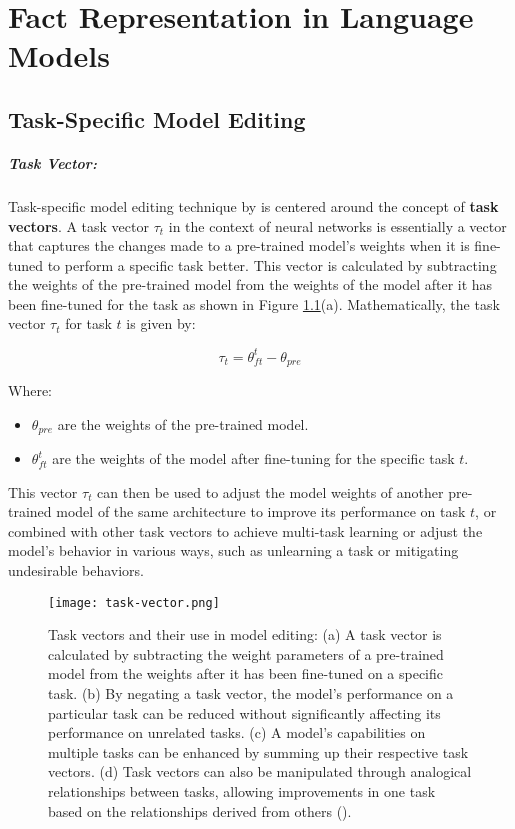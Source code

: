 \chapter{Fact Representation in Language Models}\label{chp: Fact}
\section{Task-Specific Model Editing}
\paragraph{Task Vector:} Task-specific model editing technique by \citet{ilharco2023editing} is centered around the concept of \textbf{task vectors}. A task vector \( \tau_t \) in the context of neural networks is essentially a vector that captures the changes made to a pre-trained model's weights when it is fine-tuned to perform a specific task better. This vector is calculated by subtracting the weights of the pre-trained model from the weights of the model after it has been fine-tuned for the task as shown in Figure \ref{fig:task-vector}(a). Mathematically, the task vector \( \tau_t \) for task \( t \) is given by:

\begin{equation}
\tau_t = \theta^t_{ft} - \theta_{pre}
\end{equation}

Where:
\begin{itemize}
	\item \( \theta_{pre} \) are the weights of the pre-trained model.
	\item \( \theta^t_{ft} \) are the weights of the model after fine-tuning for the specific task \( t \).
\end{itemize}

This vector \( \tau_t \) can then be used to adjust the model weights of another pre-trained model of the same architecture to improve its performance on task \( t \), or combined with other task vectors to achieve multi-task learning or adjust the model's behavior in various ways, such as unlearning a task or mitigating undesirable behaviors.

\begin{figure}[tbh]
	\centering
	\texttt{[image: task-vector.png]}
	\caption[Task vectors and their use in model editing]{Task vectors and their use in model editing: (a) A task vector is calculated by subtracting the weight parameters of a pre-trained model from the weights after it has been fine-tuned on a specific task. (b) By negating a task vector, the model's performance on a particular task can be reduced without significantly affecting its performance on unrelated tasks. (c) A model's capabilities on multiple tasks can be enhanced by summing up their respective task vectors. (d) Task vectors can also be manipulated through analogical relationships between tasks, allowing improvements in one task based on the relationships derived from others (\citet{ilharco2023editing}).}
	\label{fig:task-vector}
\end{figure}

